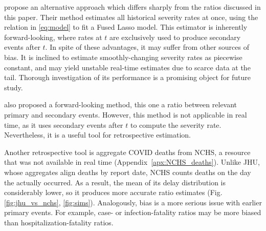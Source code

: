 \documentclass{article}
\begin{document}


\citet{fusedlasso} propose an alternative approach which differs sharply from the ratios discussed in this paper. Their method estimates all historical severity rates at once, using the relation in \eqref{eq:model} to fit a Fused Lasso model. This estimator is inherently forward-looking, where rates at $t$ are exclusively used to produce secondary events after $t$. In spite of these advantages, it may suffer from other sources of bias. It is inclined to estimate smoothly-changing severity rates as piecewise constant, and may yield unstable real-time estimates due to scarce data at the tail. 
Thorough investigation of its performance is a promising object for future study.

\citet{UKpaper} also proposed a forward-looking method, this one a ratio between relevant primary and secondary events. However, this method is not applicable in real time, as it uses secondary events after $t$ to compute the severity rate. Nevertheless, it is a useful tool for retrospective estimation. 

Another retrospective tool is aggregate COVID deaths from NCHS, a resource that was not available in real time (Appendix~\ref{apx:NCHS_deaths}). Unlike JHU, whose aggregates align deaths by report date, NCHS counts deaths on the day the actually occurred. As a result, the mean of its delay distribution is considerably lower, so it produces more accurate ratio estimates (Fig. \ref{fig:jhu_vs_nchs}, \ref{fig:sims}). Analogously, bias is a more serious issue with earlier primary events. For example, case- or infection-fatality ratios may be more biased than hospitalization-fatality ratios. 
\end{document}
